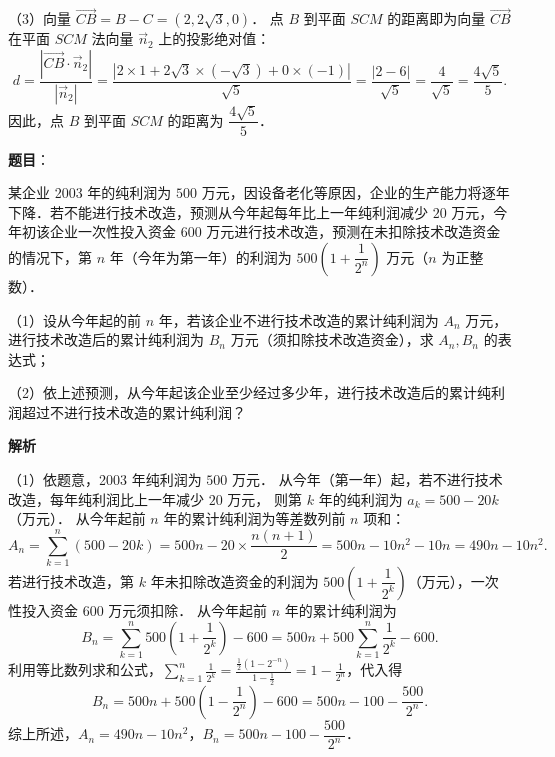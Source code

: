 \begin{answer}
（3）向量 $\vec{CB} = B - C = (2, 2\sqrt{3}, 0)$．
点 $B$ 到平面 $SCM$ 的距离即为向量 $\vec{CB}$ 在平面 $SCM$ 法向量 $\vec{n}_2$ 上的投影绝对值：
\nopagebreak[4]
\[
d = \frac{|\vec{CB} \cdot \vec{n}_2|}{|\vec{n}_2|} = \frac{|2 \times 1 + 2\sqrt{3} \times (-\sqrt{3}) + 0 \times (-1)|}{\sqrt{5}} = \frac{|2 - 6|}{\sqrt{5}} = \frac{4}{\sqrt{5}} = \frac{4\sqrt{5}}{5}.
\]
因此，点 $B$ 到平面 $SCM$ 的距离为 $\dfrac{4\sqrt{5}}{5}$．


\end{answer}
\begin{answer}

\textbf{题目}：

某企业 2003 年的纯利润为 $500$ 万元，因设备老化等原因，企业的生产能力将逐年下降．若不能进行技术改造，预测从今年起每年比上一年纯利润减少 $20$ 万元，今年初该企业一次性投入资金 $600$ 万元进行技术改造，预测在未扣除技术改造资金的情况下，第 $n$ 年（今年为第一年）的利润为 $500\left(1 + \dfrac{1}{2^n}\right)$ 万元（$n$ 为正整数）．

（1）设从今年起的前 $n$ 年，若该企业不进行技术改造的累计纯利润为 $A_n$ 万元，进行技术改造后的累计纯利润为 $B_n$ 万元（须扣除技术改造资金），求 $A_n, B_n$ 的表达式；

（2）依上述预测，从今年起该企业至少经过多少年，进行技术改造后的累计纯利润超过不进行技术改造的累计纯利润？

\textbf{解析}

（1）依题意，2003 年纯利润为 $500$ 万元．
从今年（第一年）起，若不进行技术改造，每年纯利润比上一年减少 $20$ 万元，
则第 $k$ 年的纯利润为 $a_k = 500 - 20k$（万元）．
从今年起前 $n$ 年的累计纯利润为等差数列前 $n$ 项和：
\nopagebreak[4]
\[
A_n = \sum_{k=1}^n (500 - 20k) = 500n - 20 \times \frac{n(n + 1)}{2} = 500n - 10n^2 - 10n = 490n - 10n^2.
\]
若进行技术改造，第 $k$ 年未扣除改造资金的利润为 $500\left(1 + \dfrac{1}{2^k}\right)$（万元），一次性投入资金 $600$ 万元须扣除．
从今年起前 $n$ 年的累计纯利润为
\nopagebreak[4]
\[
B_n = \sum_{k=1}^n 500\left(1 + \frac{1}{2^k}\right) - 600 = 500n + 500 \sum_{k=1}^n \frac{1}{2^k} - 600.
\]
利用等比数列求和公式，$\displaystyle\sum_{k=1}^n \frac{1}{2^k} = \frac{\frac{1}{2}(1 - 2^{-n})}{1 - \frac{1}{2}} = 1 - \frac{1}{2^n}$，代入得
\nopagebreak[4]
\[
B_n = 500n + 500\left(1 - \frac{1}{2^n}\right) - 600 = 500n - 100 - \frac{500}{2^n}.
\]
综上所述，$A_n = 490n - 10n^2$，$B_n = 500n - 100 - \dfrac{500}{2^n}$．


\end{answer}
